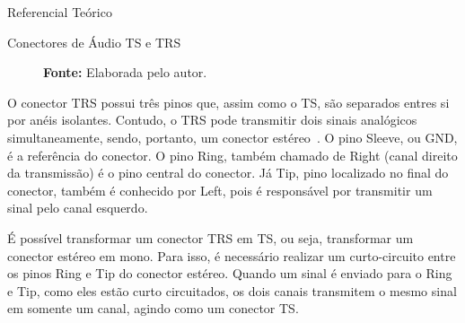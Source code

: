 \begin{chapter}{Referencial Teórico}
\begin{section}{Conectores de Áudio TS e TRS}

\begin{figure}
	\centering
	\caption{Conectores de áudio.}
	\vspace{-1cm}
	\caption*{\textbf{Fonte: }Elaborada pelo autor.}
	\label{fig:conector}
\end{figure}

O conector TRS possui três pinos que, assim como o TS, são separados 
entres si por anéis isolantes. Contudo, o TRS pode transmitir dois sinais
analógicos simultaneamente, sendo, portanto, um conector estéreo~\cite{ts}. O
pino Sleeve, ou GND, é a referência do conector. O pino Ring, também chamado de
Right (canal direito da transmissão) é o  pino central do conector. Já Tip,
pino localizado no final do conector, também é conhecido por Left, pois é 
responsável por transmitir um sinal pelo canal esquerdo.

\break 
É possível transformar um conector TRS em TS, ou seja, transformar um conector
estéreo em mono. Para isso, é necessário realizar um curto-circuito entre os
pinos Ring e Tip do conector estéreo. Quando um sinal é enviado para o Ring e
Tip, como eles estão curto circuitados, os dois canais transmitem o mesmo
sinal em somente um canal, agindo como um conector TS.



\end{section}
\end{chapter}
